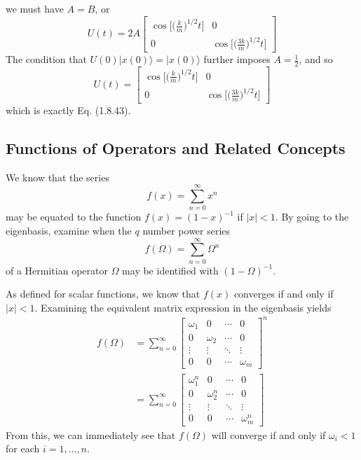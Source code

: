 \documentclass[../principles-of-quantum-mechanics.tex]{subfiles}
\begin{document}
\begin{questions}
\begin{solution}
\[	\]
	we must have $A = B$, or
	\[
		U(t) = 2A\begin{bmatrix}
			\cos\Big[\Big(\frac{k}{m}\Big)^{1/2}t\Big] & 0 \\
			0 & \cos\Big[\Big(\frac{3k}{m}\Big)^{1/2}t\Big]
		\end{bmatrix}
	\]
	The condition that $U(0)|x(0)\rangle = |x(0)\rangle$ further imposes $A = \frac{1}{2}$, and so
	\[
		U(t) = \begin{bmatrix}
		\cos\Big[\Big(\frac{k}{m}\Big)^{1/2}t\Big] & 0 \\
		0 & \cos\Big[\Big(\frac{3k}{m}\Big)^{1/2}t\Big]
		\end{bmatrix}
	\]
	which is exactly Eq. (1.8.43).
\end{solution}

\setcounter{subsection}{8}
\setcounter{question}{0}
\subsection{Functions of Operators and Related Concepts}
\question We know that the series
\[
	f(x) = \sum_{n=0}^{\infty}x^n
\]
may be equated to the function $f(x) = (1-x)^{-1}$ if $|x|<1$. By going to the eigenbasis, examine when the $q$ number power series
\[
	f(\Omega) = \sum_{n=0}^{\infty}\Omega^n
\]
of a Hermitian operator $\Omega$ may be identified with $(1 - \Omega)^{-1}$.

\begin{solution}
	As defined for scalar functions, we know that $f(x)$ converges if and only if $|x|<1$. Examining the equivalent matrix expression in the eigenbasis yields
	\begin{align*}
		f(\Omega) &= \sum_{n=0}^{\infty}\begin{bmatrix}
			\omega_1 & 0 & \cdots & 0 \\
			0 & \omega_2 & \cdots & 0 \\
			\vdots & \vdots & \ddots & \vdots \\
			0 & 0 & \cdots & \omega_m
		\end{bmatrix}^n \\
		&= \sum_{n=0}^{\infty}\begin{bmatrix}
		\omega_1^n & 0 & \cdots & 0 \\
		0 & \omega_2^n & \cdots & 0 \\
		\vdots & \vdots & \ddots & \vdots \\
		0 & 0 & \cdots & \omega_m^n
	\end{bmatrix}
	\end{align*}
	From this, we can immediately see that $f(\Omega)$ will converge if and only if $\omega_i<1$ for each $i=1,\dots,n$.
\end{solution}


\end{questions}
\end{document}
